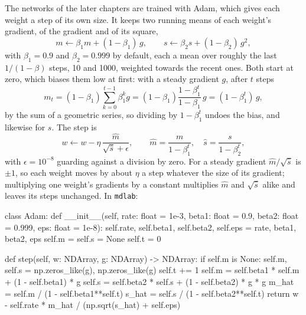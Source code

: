 The networks of the later chapters are trained with
Adam\cite{Kingma2014}, which gives each weight a step of its own size.
It keeps two running means of each weight's gradient, of the gradient
and of its square,
\begin{equation*}
   m \leftarrow \beta_1m + (1 - \beta_1)\,g , \qquad
   s \leftarrow \beta_2s + (1 - \beta_2)\,g^2 ,
\end{equation*}
with $\beta_1 = 0.9$ and $\beta_2 = 0.999$ by default, each a mean over
roughly the last $1/(1 - \beta)$ steps, 10 and 1000, weighted towards the
recent ones. Both start at zero, which biases them low at first: with a
steady gradient $g$, after $t$ steps
\begin{equation*}
   m_t = (1 - \beta_1)\sum_{k=0}^{t-1}\beta_1^kg
   = (1 - \beta_1)\frac{1 - \beta_1^t}{1 - \beta_1}\,g
   = (1 - \beta_1^t)\,g ,
\end{equation*}
by the sum of a geometric series, so dividing by $1 - \beta_1^t$ undoes
the bias, and likewise for $s$. The step is
\begin{equation*}
   w \leftarrow w - \eta\,\frac{\hat m}{\sqrt{\hat s} + \epsilon} , \qquad
   \hat m = \frac{m}{1 - \beta_1^t} , \quad \hat s = \frac{s}{1 - \beta_2^t} ,
\end{equation*}
with $\epsilon = 10^{-8}$ guarding against a division by zero. For a
steady gradient $\hat m/\sqrt{\hat s}$ is $\pm1$, so each weight moves by
about $\eta$ a step whatever the size of its gradient; multiplying one
weight's gradients by a constant multiplies $\hat m$ and $\sqrt{\hat s}$
alike and leaves its steps unchanged. In \texttt{mdlab}:

\begin{code}
class Adam:
    def __init__(self, rate: float = 1e-3, beta1: float = 0.9,
                 beta2: float = 0.999, eps: float = 1e-8):
        self.rate, self.beta1, self.beta2, self.eps = rate, beta1, beta2, eps
        self.m = self.s = None
        self.t = 0

    def step(self, w: NDArray, g: NDArray) -> NDArray:
        if self.m is None:
            self.m, self.s = np.zeros_like(g), np.zeros_like(g)
        self.t += 1
        self.m = self.beta1 * self.m + (1 - self.beta1) * g
        self.s = self.beta2 * self.s + (1 - self.beta2) * g * g
        m_hat = self.m / (1 - self.beta1**self.t)
        s_hat = self.s / (1 - self.beta2**self.t)
        return w - self.rate * m_hat / (np.sqrt(s_hat) + self.eps)
\end{code}

